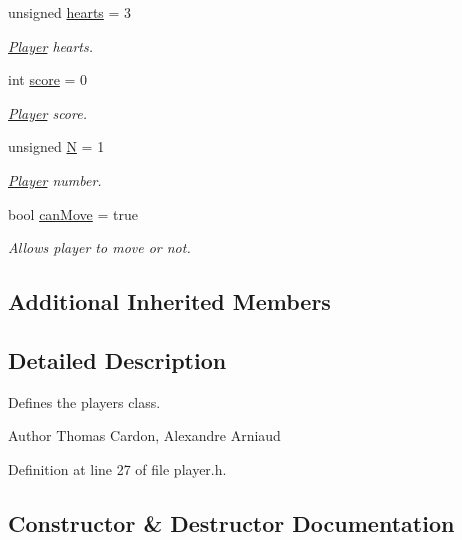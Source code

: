 \begin{DoxyCompactItemize}
\item 
unsigned \hyperlink{classns_game_1_1_player_ae01e31235ac9210a5bb71c1db166ebe6}{hearts} = 3
\begin{DoxyCompactList}\small\item\em \hyperlink{classns_game_1_1_player}{Player} hearts. \end{DoxyCompactList}\item 
int \hyperlink{classns_game_1_1_player_af284db40fc7f885cc5ad889124e182c0}{score} = 0
\begin{DoxyCompactList}\small\item\em \hyperlink{classns_game_1_1_player}{Player} score. \end{DoxyCompactList}\item 
unsigned \hyperlink{classns_game_1_1_player_a6fc5b1fa9ec5ca495fedf4908942d2f0}{N} = 1
\begin{DoxyCompactList}\small\item\em \hyperlink{classns_game_1_1_player}{Player} number. \end{DoxyCompactList}\item 
bool \hyperlink{classns_game_1_1_player_a18028809a0ff7dc90f14a154834d2533}{can\+Move} = true
\begin{DoxyCompactList}\small\item\em Allows player to move or not. \end{DoxyCompactList}\end{DoxyCompactItemize}
\subsection*{Additional Inherited Members}


\subsection{Detailed Description}
Defines the player\textquotesingle{}s class. 

\begin{DoxyAuthor}{Author}
Thomas Cardon, Alexandre Arniaud 
\end{DoxyAuthor}


Definition at line 27 of file player.\+h.



\subsection{Constructor \& Destructor Documentation}
\mbox{\label{classns_game_1_1_player_a3b9991c6a7a1f910ab53a4e9fd1eb1f9}} 
